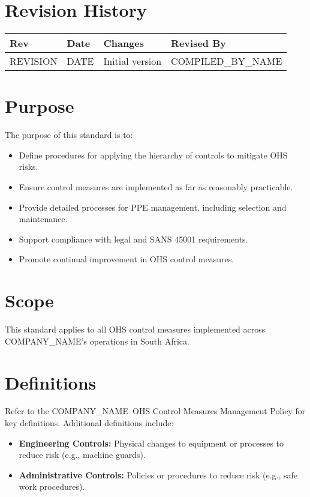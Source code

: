 \documentclass[11pt]{article}
\newcommand{\issueDate}{{{DATE}}}
\newcommand{\clientName}{{{COMPANY_NAME}}}
\newcommand{\compilerName}{{{COMPILED_BY_NAME}}}
\newcommand{\revision}{{{REVISION}}}
\begin{document}
\section{Revision History}
\begin{tabularx}{\textwidth}{lXll}
  \toprule
  \textbf{Rev} & \textbf{Date} & \textbf{Changes} & \textbf{Revised By} \\
  \midrule
  \revision & \issueDate & Initial version & \compilerName \\
  \bottomrule
\end{tabularx}

\section{Purpose}
The purpose of this standard is to:
\begin{itemize}
    \item Define procedures for applying the hierarchy of controls to mitigate OHS risks.
    \item Ensure control measures are implemented as far as reasonably practicable.
    \item Provide detailed processes for PPE management, including selection and maintenance.
    \item Support compliance with legal and SANS 45001 requirements.
    \item Promote continual improvement in OHS control measures.
\end{itemize}

\section{Scope}
This standard applies to all OHS control measures implemented across \clientName’s operations in South Africa.

\section{Definitions}
Refer to the \clientName\ OHS Control Measures Management Policy for key definitions. Additional definitions include:
\begin{itemize}
    \item \textbf{Engineering Controls:} Physical changes to equipment or processes to reduce risk (e.g., machine guards).
    \item \textbf{Administrative Controls:} Policies or procedures to reduce risk (e.g., safe work procedures).
\end{itemize}
\end{document}
